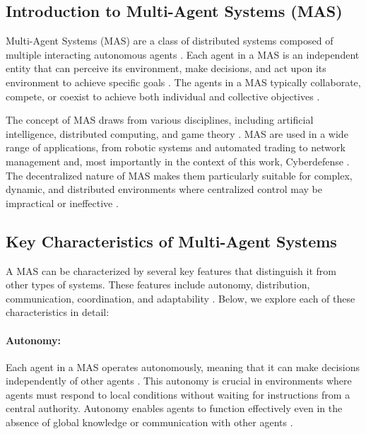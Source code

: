 \subsection{Introduction to Multi-Agent Systems (MAS)}

Multi-Agent Systems (MAS) are a class of distributed systems composed of multiple interacting autonomous agents \cite{wooldridge2009introduction}. Each agent in a MAS is an independent entity that can perceive its environment, make decisions, and act upon its environment to achieve specific goals \cite{ferber1999multi}. The agents in a MAS typically collaborate, compete, or coexist to achieve both individual and collective objectives \cite{weiss1999multiagent}.

The concept of MAS draws from various disciplines, including artificial intelligence, distributed computing, and game theory \cite{shoham2008multiagent}. MAS are used in a wide range of applications, from robotic systems and automated trading to network management and, most importantly in the context of this work, Cyberdefense \cite{jennings1998applications, shakarian2015cyber}. The decentralized nature of MAS makes them particularly suitable for complex, dynamic, and distributed environments where centralized control may be impractical or ineffective \cite{sycara1998multiagent}.

\subsection{Key Characteristics of Multi-Agent Systems}

A MAS can be characterized by several key features that distinguish it from other types of systems. These features include autonomy, distribution, communication, coordination, and adaptability \cite{wooldridge2009introduction}. Below, we explore each of these characteristics in detail:

\paragraph{Autonomy:}
Each agent in a MAS operates autonomously, meaning that it can make decisions independently of other agents \cite{jennings1998roadmap}. This autonomy is crucial in environments where agents must respond to local conditions without waiting for instructions from a central authority. Autonomy enables agents to function effectively even in the absence of global knowledge or communication with other agents \cite{russell2016artificial}.

